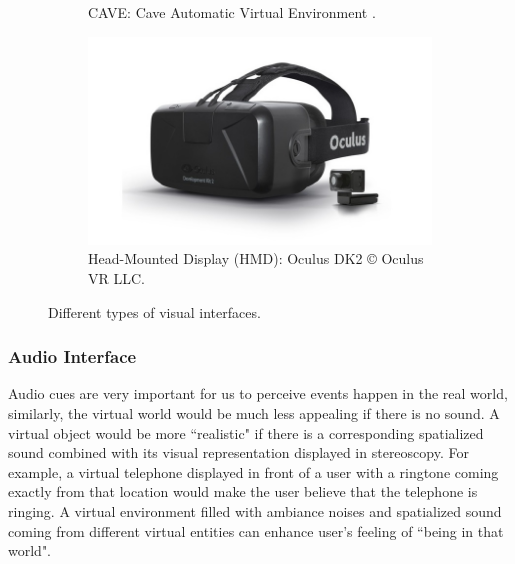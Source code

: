 \begin{figure}[htb]
\begin{subfigure}{.5\textwidth}
    \caption{CAVE\texttrademark{}: Cave Automatic Virtual Environment \citep{CruzNeira1992CAV}.}
    \label{fig:1_vi:cave}
  \end{subfigure}
  \begin{subfigure}{.45\textwidth}
    \centering
    \includegraphics[width=\linewidth]{figures/ch1/oculus}
    \caption{Head-Mounted Display (HMD): Oculus DK2 \copyright{} Oculus VR LLC.}
    \label{fig:1_vi:hmd}
  \end{subfigure}
  
  \caption{\label{fig:1_vi}Different types of visual interfaces.}
\end{figure}


\subsubsection{Audio Interface}
Audio cues are very important for us to perceive events happen in the real world, similarly, the virtual world would be much less appealing if there is no sound. A virtual object would be more ``realistic" if there is a corresponding spatialized sound combined with its visual representation displayed in stereoscopy. For example, a virtual telephone displayed in front of a user with a ringtone coming exactly from that location would make the user believe that the telephone is ringing. A virtual environment filled with ambiance noises and spatialized sound coming from different virtual entities can enhance user's feeling of ``being in that world".

